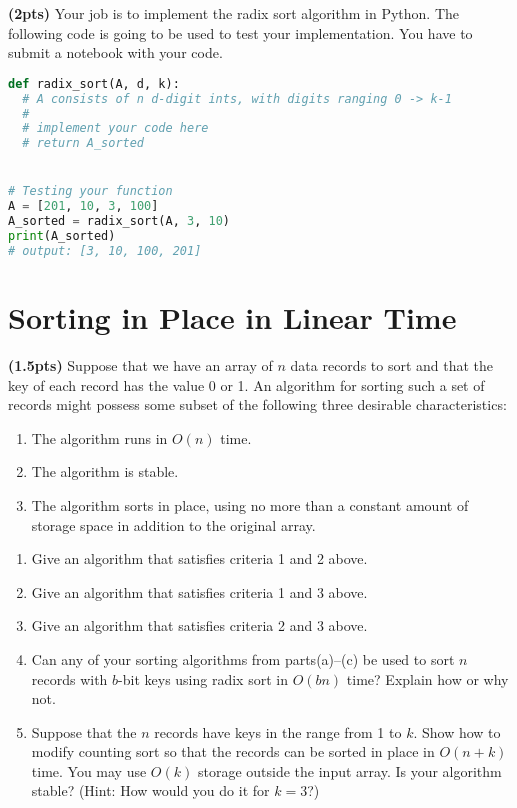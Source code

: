 \documentclass{article}
\begin{document}
\textbf{(2pts) }Your job is to implement the radix sort algorithm in Python. The following code is going to be used to test your implementation. You have to submit a notebook with your code. 
  
\begin{lstlisting}[language=Python]
def radix_sort(A, d, k):
  # A consists of n d-digit ints, with digits ranging 0 -> k-1
  #
  # implement your code here
  # return A_sorted


# Testing your function
A = [201, 10, 3, 100]
A_sorted = radix_sort(A, 3, 10)
print(A_sorted)
# output: [3, 10, 100, 201]
\end{lstlisting}

\section{Sorting in Place in Linear Time}
\textbf{(1.5pts)} Suppose that we have an array of $n$ data records to sort and that the key of each record has the value 0 or 1. An algorithm for sorting such a set of records might possess some subset of the following three desirable characteristics:

\begin{enumerate}
  \item The algorithm runs in $O(n)$ time.
  \item The algorithm is stable.
  \item The algorithm sorts in place, using no more than a constant amount of storage space in addition to the original array.
\end{enumerate}

\begin{enumerate}[label=(\alph*)]
  \item Give an algorithm that satisfies criteria 1 and 2 above.
  \item Give an algorithm that satisfies criteria 1 and 3 above.
  \item Give an algorithm that satisfies criteria 2 and 3 above.
  \item Can any of your sorting algorithms from parts(a)–(c) be used to sort $n$ records with $b$-bit keys using radix sort in $O(bn)$ time? Explain how or why not.
  \item Suppose that the $n$ records have keys in the range from 1 to $k$. Show how to modify counting sort so that the records can be sorted in place in $O(n + k)$ time. You may use $O(k)$ storage outside the input array. Is your algorithm stable? (Hint: How would you do it for $k = 3$?)

\end{enumerate}
\end{document}
